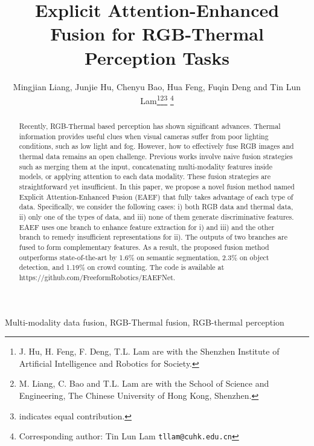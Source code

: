 \documentclass[letterpaper, 10 pt, journal, twoside]{IEEEtran}
\begin{document}
\title{Explicit Attention-Enhanced Fusion for RGB-Thermal Perception Tasks}

\author{Mingjian Liang, Junjie Hu, Chenyu Bao, Hua Feng, Fuqin Deng and Tin Lun Lam\thanks{J. Hu, H. Feng, F. Deng, T.L. Lam are with the Shenzhen Institute of Artificial Intelligence and Robotics for Society.}\thanks{M. Liang, C. Bao and T.L. Lam are with the School of Science and Engineering, The Chinese University of Hong Kong, Shenzhen.}\thanks{ indicates equal contribution.}
\thanks{Corresponding author: Tin Lun Lam
        {\tt\small tllam@cuhk.edu.cn}
        }}











\maketitle

\begin{abstract}

    Recently, RGB-Thermal based perception has shown significant advances. Thermal information provides useful clues when visual cameras suffer from poor lighting conditions, such as low light and fog. However, how to effectively fuse RGB images and thermal data remains an open challenge. Previous works involve naive fusion strategies such as merging them at the input, concatenating multi-modality features inside models, or applying attention to each data modality. 
    These fusion strategies are straightforward yet insufficient. 
    In this paper, we propose a novel fusion method named Explicit Attention-Enhanced Fusion (EAEF) that fully takes advantage of each type of data. Specifically, we consider the following cases: i) both RGB data and thermal data, ii) only one of the types of data, and iii) none of them generate discriminative features. EAEF uses one branch to enhance feature extraction for i) and iii) and the other branch to remedy insufficient representations for ii).
    The outputs of two branches are fused to form complementary features. As a result, the proposed fusion method outperforms state-of-the-art by 1.6\% on semantic segmentation, 2.3\% on object detection, and 1.19\% on crowd counting. The code is available at https://github.com/FreeformRobotics/EAEFNet.

\end{abstract}

\begin{IEEEkeywords}
Multi-modality data fusion, RGB-Thermal fusion, RGB-thermal perception
\end{IEEEkeywords}
\end{document}

